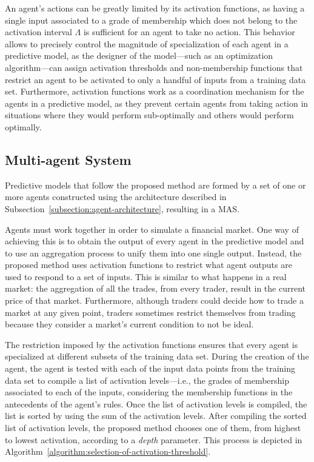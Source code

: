 ﻿\documentclass{ieeeaccess}
\begin{document}
An agent's actions can be greatly limited by its activation functions, as having
a single input associated to a grade of membership which does not belong to the
activation interval $\Lambda$ is sufficient for an agent to take no action. This
behavior allows to precisely control the magnitude of specialization of each agent
in a predictive model, as the designer of the model---such as an optimization algorithm---can
assign activation thresholds and non-membership functions
that restrict an agent to be activated to only a handful of inputs from a
training data set. Furthermore, activation functions work as a coordination
mechanism for the agents in a predictive model, as they prevent certain agents
from taking action in situations where they would perform sub-optimally and
others would perform optimally.

\subsection{Multi-agent System}
\label{subsection:mult-agent-system}

Predictive models that follow the proposed method are formed by a set
of one or more agents constructed using the architecture described in
Subsection~\ref{subsection:agent-architecture}, resulting in a MAS.

Agents must work together in order to simulate a financial market. One
way of achieving this is to obtain the output of every agent in the
predictive model and to use an aggregation process to unify them into
one single output. Instead, the proposed method uses activation
functions to restrict what agent outputs are used to respond to a set
of inputs. This is similar to what happens in a real market: the
aggregation of all the trades, from every trader, result in the current
price of that market. Furthermore, although traders could decide how to trade a
market at any given point, traders sometimes restrict themselves from
trading because they consider a market's current condition to not be
ideal.

The restriction imposed by the activation functions ensures that every
agent is specialized at different subsets of the training data
set. During the creation of the agent, the agent is tested with
each of the input data points from the training data set to compile a
list of activation levels---i.e., the grades of membership associated
to each of the inputs, considering the membership functions in the
antecedents of the agent's rules. Once the list of activation levels
is compiled, the list is sorted by using the sum of the activation
levels. After compiling the sorted list of activation levels, the proposed
method chooses one of them, from highest to lowest activation,
according to a \textit{depth} parameter. This process is depicted in
Algorithm~\ref{algorithm:selection-of-activation-threshold}.
\end{document}
